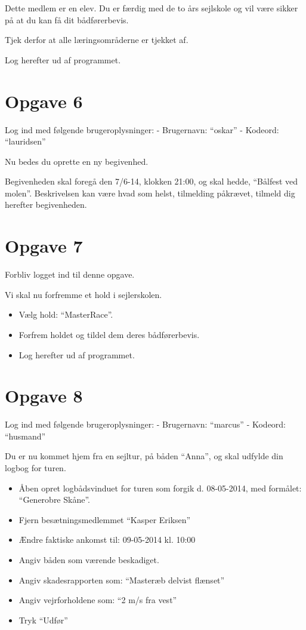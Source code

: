 Dette medlem er en elev. Du er færdig med de to års sejlskole og vil være sikker på at du kan få dit bådførerbevis.

Tjek derfor at alle læringsområderne er tjekket af.

Log herefter ud af programmet.


\section{Opgave 6} 

Log ind med følgende brugeroplysninger: 
\newline - Brugernavn: ``oskar''
\newline - Kodeord: ``lauridsen''

Nu bedes du oprette en ny begivenhed.

Begivenheden skal foregå den 7/6-14, klokken 21:00, og skal hedde, ``Bålfest ved molen''. Beskrivelsen kan være hvad som helst, tilmelding påkrævet, tilmeld dig herefter begivenheden.


\section{Opgave 7}

Forbliv logget ind til denne opgave.

Vi skal nu forfremme et hold i sejlerskolen.

\begin{itemize}
\item Vælg hold: ``MasterRace''.
\item Forfrem holdet og tildel dem deres bådførerbevis.
\item Log herefter ud af programmet.
\end{itemize}

\section{Opgave 8}

Log ind med følgende brugeroplysninger: 
\newline - Brugernavn: ``marcus''
\newline - Kodeord: ``husmand''

Du er nu kommet hjem fra en sejltur, på båden ``Anna'', og skal udfylde din logbog for turen.

\begin{itemize}
	\item Åben opret logbådsvinduet for turen som forgik d. 08-05-2014, med formålet: ``Generobre Skåne''.
	\item Fjern besætningsmedlemmet ``Kasper Eriksen''
	\item Ændre faktiske ankomst til: 09-05-2014 kl. 10:00
	\item Angiv båden som værende beskadiget.
	\item Angiv skadesrapporten som: ``Masteræb delvist flænset''
	\item Angiv vejrforholdene som: ``2 m/s fra vest''
	\item Tryk ``Udfør''
\end{itemize}

